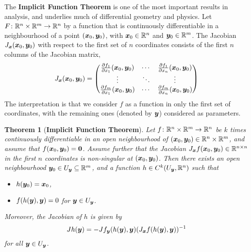 \documentclass[11pt,a4paper]{memoir}
\newtheorem*{theorem*}{Theorem}
\begin{document}
The \textbf{Implicit Function Theorem} is one of the most important results in analysis, and underlies much of differential geometry and physics. 
Let $F\colon \mathbb{R}^{n}\times \mathbb{R}^{m}\to \mathbb{R}^n$ by a function that is continuously differentiable in a neighbourhood of a point $(\bm{x}_0,\bm{y}_0)$, with $\bm{x}_0\in \mathbb{R}^n$ and $\bm{y}_0\in \mathbb{R}^m$. The Jacobian $J_{\bm{x}}(\bm{x}_0,\bm{y}_0)$ with respect to the first set of $n$ coordinates consists of the first $n$ columns of the Jacobian matrix,
\begin{equation*}
 J_{\bm{x}}(\bm{x}_0,\bm{y}_0) = \begin{pmatrix}
                                     \frac{\partial f_1}{\partial x_1}(\bm{x}_0,\bm{y}_0) & \cdots & \frac{\partial f_1}{\partial x_n}(\bm{x}_0,\bm{y}_0)\\
                                     \vdots & \ddots & \vdots\\
                                     \frac{\partial f_m}{\partial x_1}(\bm{x}_0,\bm{y}_0) & \cdots & \frac{\partial f_m}{\partial x_n}(\bm{x}_0,\bm{y}_0)
                                    \end{pmatrix}
\end{equation*}
The interpretation is that we consider $f$ as a function in only the first set of coordinates, with the remaining ones (denoted by $\bm{y}$) considered as parameters.

\begin{theorem*}[\textbf{Implicit Function Theorem}]
Let $f\colon \mathbb{R}^n\times \mathbb{R}^m\to \mathbb{R}^n$ be $k$ times continuously differentiable in an open neighbourhood of $(\bm{x}_0,\bm{y}_0)\in \mathbb{R}^{n}\times \mathbb{R}^m$, and assume that $f(\bm{x}_0,\bm{y}_0) = \bm{0}$. Assume further 
that the Jacobian $J_{\bm{x}}f(\bm{x}_0,\bm{y}_0)\in \mathbb{R}^{n\times n}$ in the first $n$ coordinates is {\em non-singular} at $(\bm{x}_0,\bm{y}_0)$. Then there exists an open neighbourhood $\bm{y}_0\in U_{\bm{y}}\subseteq \mathbb{R}^m$, and a function $h\in C^k(U_{\bm{y}},\mathbb{R}^n)$ such that 
\begin{itemize}
 \item $h(\bm{y}_0) = \bm{x}_0$,
\item $f(h(\bm{y}),\bm{y})=0$ for $\bm{y}\in U_{\bm{y}}$.
\end{itemize}
Moreover, the Jacobian of $h$ is given by
\begin{equation*}
 Jh(\bm{y}) = -Jf_{\bm{y}}(h(\bm{y}),\bm{y}) (J_{\bm{x}}f(h(\bm{y}),\bm{y}))^{-1}
\end{equation*}
for all $\bm{y}\in U_{\bm{y}}$.
\end{theorem*}
\end{document}
